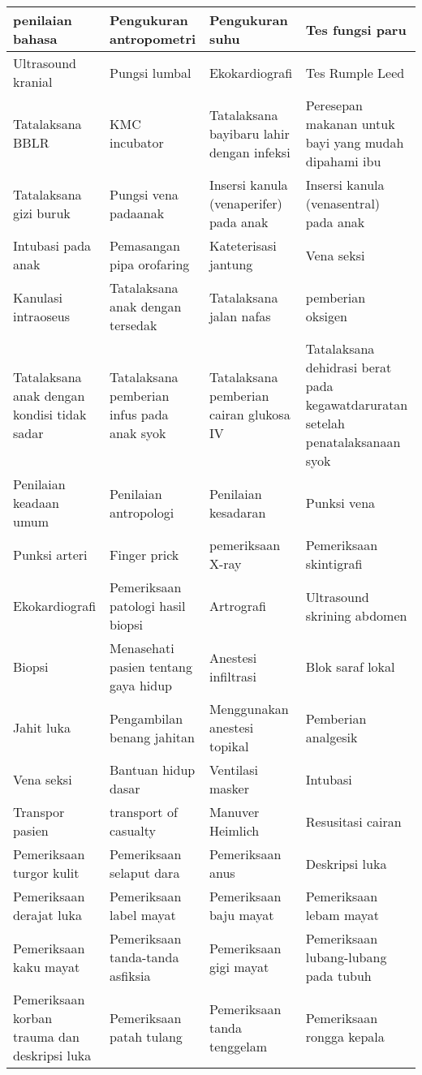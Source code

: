 {\begin{longtable}{|p{}|p{}|p{}|p{}|}
	penilaian bahasa & Pengukuran antropometri & Pengukuran suhu & Tes fungsi paru \\ \hline
	Ultrasound kranial & Pungsi lumbal & Ekokardiografi & Tes Rumple Leed \\ \hline
	Tatalaksana BBLR & KMC incubator & Tatalaksana bayibaru lahir dengan infeksi & Peresepan makanan untuk bayi yang mudah dipahami ibu \\ \hline
	Tatalaksana gizi buruk & Pungsi vena padaanak & Insersi kanula (venaperifer) pada anak & Insersi kanula (venasentral) pada anak \\ \hline
	Intubasi pada anak & Pemasangan pipa orofaring & Kateterisasi jantung & Vena seksi \\ \hline
	Kanulasi intraoseus & Tatalaksana anak dengan tersedak & Tatalaksana jalan nafas & pemberian oksigen \\ \hline
	Tatalaksana anak dengan kondisi tidak sadar & Tatalaksana pemberian infus pada anak syok & Tatalaksana pemberian cairan glukosa IV & Tatalaksana dehidrasi berat pada kegawatdaruratan setelah penatalaksanaan syok \\ \hline
	Penilaian keadaan umum & Penilaian antropologi & Penilaian kesadaran & Punksi vena \\ \hline
	Punksi arteri & Finger prick & pemeriksaan X-ray & Pemeriksaan skintigrafi \\ \hline
	Ekokardiografi & Pemeriksaan patologi hasil biopsi & Artrografi & Ultrasound skrining abdomen \\ \hline
	Biopsi & Menasehati pasien tentang gaya hidup & Anestesi infiltrasi & Blok saraf lokal \\ \hline
	Jahit luka & Pengambilan benang jahitan & Menggunakan anestesi topikal & Pemberian analgesik \\ \hline
	Vena seksi & Bantuan hidup dasar & Ventilasi masker & Intubasi \\ \hline
	Transpor pasien & transport of casualty & Manuver Heimlich & Resusitasi cairan \\ \hline
	Pemeriksaan turgor kulit & Pemeriksaan selaput dara & Pemeriksaan anus & Deskripsi luka \\ \hline
	Pemeriksaan derajat luka & Pemeriksaan label mayat & Pemeriksaan baju mayat & Pemeriksaan lebam mayat \\ \hline
	Pemeriksaan kaku mayat & Pemeriksaan tanda-tanda asfiksia & Pemeriksaan gigi mayat & Pemeriksaan lubang-lubang pada tubuh \\ \hline
	Pemeriksaan korban trauma dan deskripsi luka & Pemeriksaan patah tulang & Pemeriksaan tanda tenggelam & Pemeriksaan rongga kepala \\ \hline

\end{longtable}}
